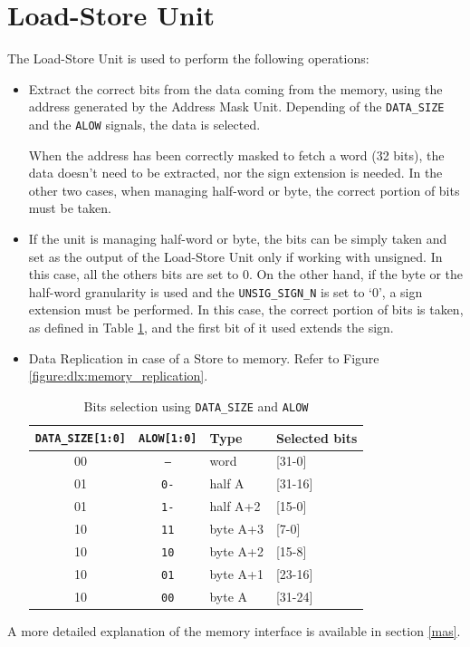 \section{Load-Store Unit}
\label{sec:ldstr}
The Load-Store Unit is used to perform the following operations:
\begin{itemize}
    \item Extract the correct bits from the data coming from the memory, using the address generated by the Address Mask Unit. Depending of the \texttt{DATA\_SIZE} and the \texttt{ALOW} signals, the data is selected.
    
    When the address has been correctly masked to fetch a word (32 bits), the data doesn't need to be extracted, nor the sign extension is needed. In the other two cases, when managing half-word or byte, the correct portion of bits must be taken. 

    \item If the unit is managing half-word or byte, the bits can be simply taken and set as the output of the Load-Store Unit only if working with unsigned. In this case, all the others bits are set to 0. On the other hand, if the byte or the half-word granularity is used and the \texttt{UNSIG\_SIGN\_N} is set to `0', a sign extension must be performed. In this case, the correct portion of bits is taken, as defined in Table \ref{tab:addr_selection}, and the first bit of it used extends the sign.

    \item Data Replication in case of a Store to memory. Refer to Figure \ref{figure:dlx:memory_replication}.  


    \begin{table}[H]
        \begin{center}
            \begin{tabular}{ |c| c | l | l|}
                \hline
                \texttt{DATA\_SIZE[1:0]} & \texttt{ALOW[1:0]} & \textbf{Type} & \textbf{Selected bits}\\
                \hline
                00 & \texttt{--} & word & [31-0]\\
                01 & \texttt{0-} & half A & [31-16]\\
                01 & \texttt{1-} & half A+2 & [15-0]\\
                10 & \texttt{11} & byte A+3 & [7-0]\\
                10 & \texttt{10} & byte A+2 & [15-8]\\
                10 & \texttt{01} & byte A+1 & [23-16]\\
                10 & \texttt{00} & byte A & [31-24]\\
                \hline
                
            \end{tabular}
            \caption{Bits selection using \texttt{DATA\_SIZE} and \texttt{ALOW}}
            \label{tab:addr_selection}
        \end{center}
    \end{table}

    
\end{itemize}
A more detailed explanation of the memory interface is available in section \ref{mas}.